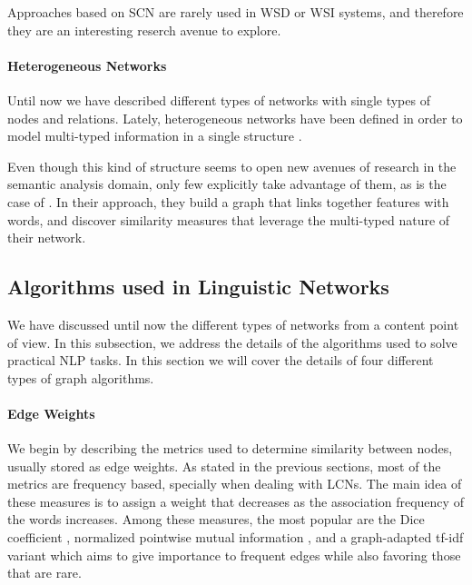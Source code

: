 Approaches based on SCN are rarely used in WSD or WSI systems, and therefore they are an interesting reserch avenue to explore.


\paragraph{Heterogeneous Networks}
Until now we have described different types of networks with single types of nodes and relations. Lately, heterogeneous networks have been defined in order to model multi-typed information in a single structure \cite{Jiawei2009}. 

Even though this kind of structure seems to open new avenues of research in the semantic analysis domain, only few explicitly take advantage of them, as is the case of \cite{2013.Saluja.Graph-BasedUnsupervisedLearning}. In their approach, they build a graph that links together features with words, and discover similarity measures that leverage the multi-typed nature of their network.

 
 
\subsection{Algorithms used in Linguistic Networks}

We have discussed until now the different types of networks from a content point of view. In this subsection, we address the details of the algorithms used to solve practical NLP tasks. In this section we will cover the details of four different types of graph algorithms.



\paragraph{Edge Weights}

We begin by describing the metrics used to determine similarity between nodes, usually stored as edge weights. As stated in the previous sections, most of the metrics are frequency based, specially when dealing with LCNs. The main idea of these measures is to assign a weight that decreases as the association frequency of the words increases. Among these measures, the most popular are the Dice  coefficient \cite{2010.Navigli.InducingWordSenses.Triangles,2011.DiMarco.Navigli.ClusteringWebSearch,2013.DiMarco.Navigli.ClusteringGraph-BasedWSI}, normalized pointwise mutual information \cite{2013.Hope.GradedWSI}, and a graph-adapted tf-idf variant \cite{2007.Tsatsaronis.WSDwithSpreading} which aims to give importance to frequent edges while also favoring those that are rare.

